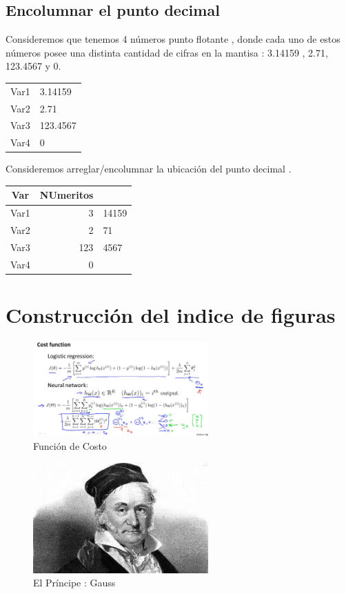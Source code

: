 \documentclass[]{article}
\begin{document}
\subsection{Encolumnar el punto decimal}
Consideremos que tenemos 4 números punto flotante
, donde cada uno de estos números posee una distinta
cantidad de cifras en la mantisa : 3.14159 , 2.71,
123.4567 y 0.

\begin{center}
\begin{tabular}{cl}
	\hline
	Var1 & 3.14159\\
	Var2 & 2.71\\
	Var3 & 123.4567\\
	Var4 & 0\\
	\hline
\end{tabular}
\end{center}

Consideremos arreglar/encolumnar la ubicación del punto decimal .

\begin{center}
	\begin{tabular}{cr@{.}l}
		Var & NUmeritos & \\
		\hline
		Var1 & 3&14159\\
		Var2 & 2&71\\
		Var3 & 123&4567\\
		Var4 & 0&\\
		\hline
	\end{tabular}
\end{center}

\section{Construcción del indice de figuras}
\lipsum[2-5]

\begin{figure}[h]
\centering
\includegraphics[width=0.6\textwidth]{Figuras/1520130384733.jpg}
\caption{Función de Costo}
\label{fig: Costo}
\end{figure}
\lipsum[1-9]

\begin{figure}[h]
	\centering
	\includegraphics[width=0.6\textwidth]{Figuras/gauss.jpg}
	\caption{El Príncipe : Gauss}
	\label{fig : gauss}
\end{figure}
\lipsum[3]
\end{document}
